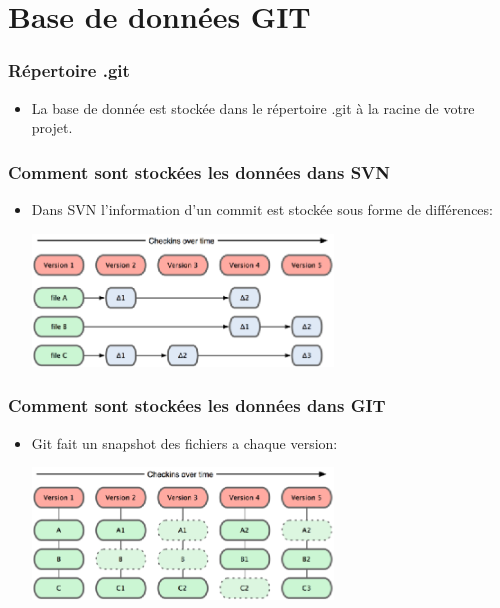 \documentclass{beamer}
\begin{document}
    \section{Base de données GIT}

    \begin{frame}
      \frametitle{Répertoire .git}
      \begin{itemize}
      \item La base de donnée est stockée dans le répertoire .git à la racine de votre projet.
      \end{itemize}
    \end{frame}

    \begin{frame}
      \frametitle{Comment sont stockées les données dans SVN}
      \begin{itemize}
        \item Dans SVN l'information d'un commit est stockée sous forme de différences:
          \begin{center}
            \includegraphics[width=8cm]{imgs/deltas.eps}
          \end{center}
      \end{itemize}
    \end{frame}

   \begin{frame}
      \frametitle{Comment sont stockées les données dans GIT}
      \begin{itemize}
        \item Git fait un snapshot des fichiers a chaque version:
          \begin{center}
            \includegraphics[width=8cm]{imgs/snapshot.eps}
          \end{center}
      \end{itemize}
    \end{frame}
\end{document}
